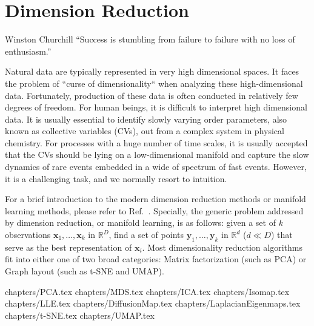 \chapter{Dimension Reduction\label{chapter:DR}}
\begin{chapquote}{Winston Churchill%
	}
	``Success is stumbling from failure to failure with no loss of enthusiasm.''
\end{chapquote}
Natural data are typically represented in very high dimensional spaces. It faces the problem of ``curse of dimensionality`` when analyzing these high-dimensional data. Fortunately, production of these data is often conducted in relatively few degrees of freedom. For human beings, it is difficult to interpret high dimensional data. It is usually essential to identify slowly varying order parameters, also known as collective variables (CVs), out from a complex system in physical chemistry. For processes with a huge number of time scales, it is usually accepted that the CVs should be lying on a low-dimensional manifold and capture the slow dynamics of rare events embedded in a wide of spectrum of fast events. However, it is a challenging task, and we normally resort to intuition.

For a brief introduction to the modern dimension reduction methods or manifold learning methods, please refer to Ref.~\cite{IzamanWIREsCS2012}. Specially, the generic problem addressed by dimension reduction, or manifold learning, is as follows: given a set of $k$ observations $\mathbf{x}_1,\dots,\mathbf{x}_k$ in $\mathbb{R}^D$, find a set of points $\mathbf{y}_1,\dots,\mathbf{y}_k$ in $\mathbb{R}^d$ ($d\ll D$) that serve as the best representation of $\mathbf{x}_i$. Most dimensionality reduction algorithms fit into either one of two broad categories: Matrix factorization (such as PCA) or Graph layout (such as t-SNE and UMAP).

\clearpage 
 {chapters/PCA.tex}
\clearpage
 {chapters/MDS.tex}
\clearpage
 {chapters/ICA.tex}
\clearpage
 {chapters/Isomap.tex}
\clearpage
 {chapters/LLE.tex}
\clearpage
 {chapters/DiffusionMap.tex}
\clearpage
 {chapters/LaplacianEigenmaps.tex}
\clearpage
 {chapters/t-SNE.tex}
\clearpage
 {chapters/UMAP.tex}